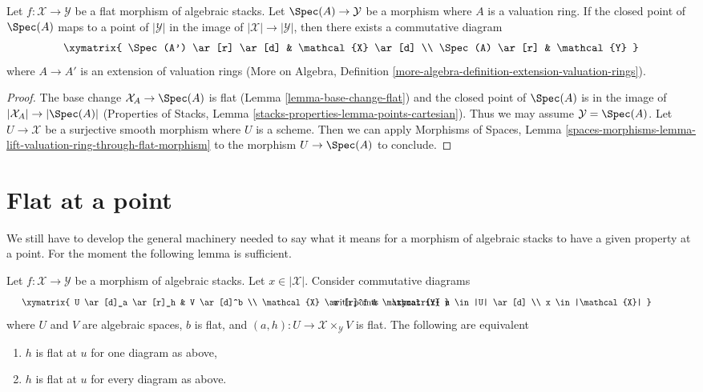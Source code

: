 \begin{lemma}
\label{lemma-lift-valuation-ring-through-flat-morphism}
Let $f : \mathcal{X} \to \mathcal{Y}$ be a flat morphism
of algebraic stacks. Let $\Spec(A) \to \mathcal{Y}$ be a morphism
where $A$ is a valuation ring. If the closed point of $\Spec(A)$ maps to a
point of $|\mathcal{Y}|$ in the image of $|\mathcal{X|} \to |\mathcal{Y}|$,
then there exists a commutative diagram
$$
\xymatrix{
\Spec(A') \ar[r] \ar[d] & \mathcal{X} \ar[d] \\
\Spec(A) \ar[r] & \mathcal{Y}
}
$$
where $A \to A'$ is an extension of valuation rings
(More on Algebra, Definition
\ref{more-algebra-definition-extension-valuation-rings}).
\end{lemma}

\begin{proof}
The base change $\mathcal{X}_A \to \Spec(A)$ is flat
(Lemma \ref{lemma-base-change-flat}) and the closed point of
$\Spec(A)$ is in the image of $|\mathcal{X}_A| \to |\Spec(A)|$
(Properties of Stacks, Lemma \ref{stacks-properties-lemma-points-cartesian}).
Thus we may assume $\mathcal{Y} = \Spec(A)$. Let $U \to \mathcal{X}$
be a surjective smooth morphism where $U$ is a scheme.
Then we can apply Morphisms of Spaces, Lemma
\ref{spaces-morphisms-lemma-lift-valuation-ring-through-flat-morphism}
to the morphism $U \to \Spec(A)$ to conclude.
\end{proof}







\section{Flat at a point}
\label{section-flat-at-point}

\noindent
We still have to develop the general machinery needed to say what
it means for a morphism of algebraic stacks to have a given property
at a point. For the moment the following lemma is sufficient.

\begin{lemma}
\label{lemma-flat-at-point}
Let $f : \mathcal{X} \to \mathcal{Y}$ be a morphism of algebraic stacks.
Let $x \in |\mathcal{X}|$. Consider commutative diagrams
$$
\vcenter{
\xymatrix{
U \ar[d]_a \ar[r]_h & V \ar[d]^b \\
\mathcal{X} \ar[r]^f & \mathcal{Y}
}
}
\quad\text{with points}
\vcenter{
\xymatrix{
u \in |U| \ar[d] \\
x \in |\mathcal{X}|
}
}
$$
where $U$ and $V$ are algebraic spaces, $b$ is flat, and
$(a, h) : U \to \mathcal{X} \times_\mathcal{Y} V$
is flat. The following are equivalent
\begin{enumerate}
\item $h$ is flat at $u$ for one diagram as above,
\item $h$ is flat at $u$ for every diagram as above.
\end{enumerate}
\end{lemma}

